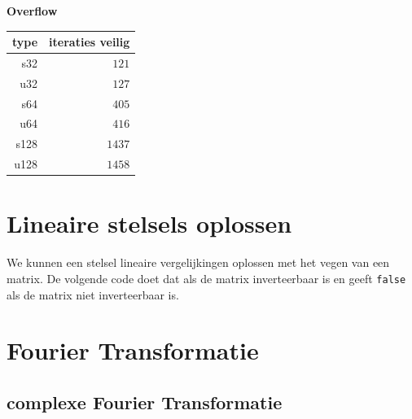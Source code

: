 \documentclass[10pt,a4paper,titlepage]{article}
\begin{document}
\begin{minipage}{0.7\textwidth}

\end{minipage}
\begin{minipage}{0.3\textwidth}
\textbf{Overflow}

\begin{tabular}{|r|r|} \hline
type & iteraties veilig \\ \hline
s32 & $121$ \\ \hline
u32 & $127$ \\ \hline
s64 & $405$ \\ \hline
u64 & $416$ \\ \hline
s128 & $1437$ \\ \hline
u128 & $1458$ \\ \hline
\end{tabular}
\end{minipage}


\section{Lineaire stelsels oplossen}

We kunnen een stelsel lineaire vergelijkingen oplossen met het vegen van een matrix. De volgende code doet dat als de matrix inverteerbaar is en geeft \texttt{false} als de matrix niet inverteerbaar is.

\iffalse
\section{Fourier Transformatie}

\subsection{complexe Fourier Transformatie}
\end{document}
